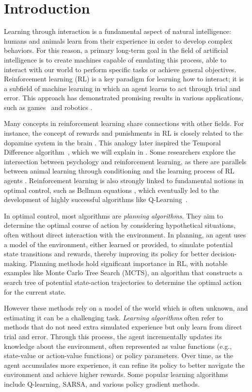 \chapter{Introduction}
Learning through interaction is a fundamental aspect of natural intelligence: humans and animals learn from their experience in order to develop complex behaviors. For this reason, a primary long-term goal in the field of artificial intelligence is to create machines capable of emulating this process, able to interact with our world to perform specific tasks or achieve general objectives. Reinforcement learning (RL) is a key paradigm for learning how to interact; it is a subfield of machine learning in which an agent learns to act through trial and error. This approach has demonstrated promising results in various applications, such as games~\citep{tesauro1994td, mnih2013playing, silver2016mastering} and robotics \citep{levine2018learning}.

Many concepts in reinforcement learning share connections with other fields. For instance, the concept of rewards and punishments in RL is closely related to the dopamine system in the brain \citep{schultz1997neural}. This analogy later inspired the Temporal Difference algorithm~\citep{sutton1988learning}, which we will explain in . Some researchers explore the intersection between psychology and reinforcement learning, as there are parallels between animal learning through conditioning and the learning process of RL agents \citep{sutton1981toward}. Reinforcement learning is also strongly linked to fundamental notions in optimal control, such as Bellman equations \citep{bellman1954theory, bellman1959adaptive}, which eventually led to the development of highly successful algorithms like Q-Learning~\citep{watkins1992q}.

In optimal control, most algorithms are \emph{planning algorithms}. They aim to determine the optimal course of action by considering hypothetical situations, often without direct interaction with the environment. In planning, an agent uses a model of the environment, either learned or provided, to simulate potential state transitions and rewards, thereby improving its policy for better decision-making. Planning methods hold significant importance in RL, with notable examples like Monte Carlo Tree Search (MCTS), an algorithm that constructs a search tree of potential state-action trajectories to determine the optimal action for the current state.

However these methods rely on a model of the world which is often unknown, and estimating it can be a challenging task. \emph{Learning algorithms} often refer to methods that do not need extra simulated experience but only learn from direct trial and error. Through this process, the agent incrementally updates its knowledge about the environment, often represented as value functions (e.g., state-value or action-value functions) or policy parameters. Over time, as the agent accumulates more experience, it can refine its policy to better navigate the environment and achieve higher rewards. Some popular learning algorithms include Q-learning, SARSA, and various policy gradient methods.

